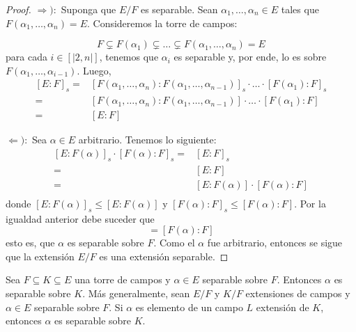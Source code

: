 \documentclass[12pt]{report}
\theoremstyle{largebreak}
\newcommand\natint[1]{\ensuremath{\left[\big|#1\big|\right]}}
\begin{document}
    \begin{proof}
        $\Rightarrow):$ Suponga que $E/F$ es separable. Sean $\alpha_1,\dots,\alpha_n\in E$ tales que $F(\alpha_1,\dots,\alpha_n)=E$. Consideremos la torre de campos:
        
        \begin{equation*}
            F\subsetneq F(\alpha_1)\subsetneq\dots\subsetneq F(\alpha_1,\dots,\alpha_n)=E
        \end{equation*}
        para cada $i\in\natint{2,n}$, tenemos que $\alpha_i$ es separable y, por ende, lo es sobre $F(\alpha_1,\dots,\alpha_{i-1})$. Luego,
        \begin{equation*}
            \begin{split}
                [E:F]_s=&[F(\alpha_1,\dots,\alpha_n):F(\alpha_1,\dots,\alpha_{n-1})]_s\cdot\dots\cdot[F(\alpha_1):F]_s\\
                =&[F(\alpha_1,\dots,\alpha_n):F(\alpha_1,\dots,\alpha_{n-1})]\cdot\dots\cdot[F(\alpha_1):F]\\
                =&[E:F]
            \end{split}
        \end{equation*}

        $\Leftarrow):$ Sea $\alpha\in E$ arbitrario. Tenemos lo siguiente:
        \begin{equation*}
            \begin{split}
                [E:F(\alpha)]_s\cdot[F(\alpha):F]_s=&[E:F]_s\\
                =&[E:F]\\
                =&[E:F(\alpha)]\cdot[F(\alpha):F]\\
            \end{split}
        \end{equation*}
        donde $[E:F(\alpha)]_s\leq [E:F(\alpha)]$ y $[F(\alpha):F]_s\leq [F(\alpha):F]$. Por la igualdad anterior debe suceder que
        \begin{equation*}
            [F(\alpha):F]=[F(\alpha):F]
        \end{equation*}
        esto es, que $\alpha$ es separable sobre $F$. Como el $\alpha$ fue arbitrario, entonces se sigue que la extensión $E/F$ es una extensión separable.

    \end{proof}

    \begin{obs}
        Sea $F\subseteq K \subseteq E$ una torre de campos y $\alpha\in E$ separable sobre $F$. Entonces $\alpha$ es separable sobre $K$. Más generalmente, sean $E/F$ y $K/F$ extensiones de campos y $\alpha\in E$ separable sobre $F$. Si $\alpha$ es elemento de un campo $L$ extensión de $K$, entonces $\alpha$ es separable sobre $K$.
    \end{obs}
\end{document}
